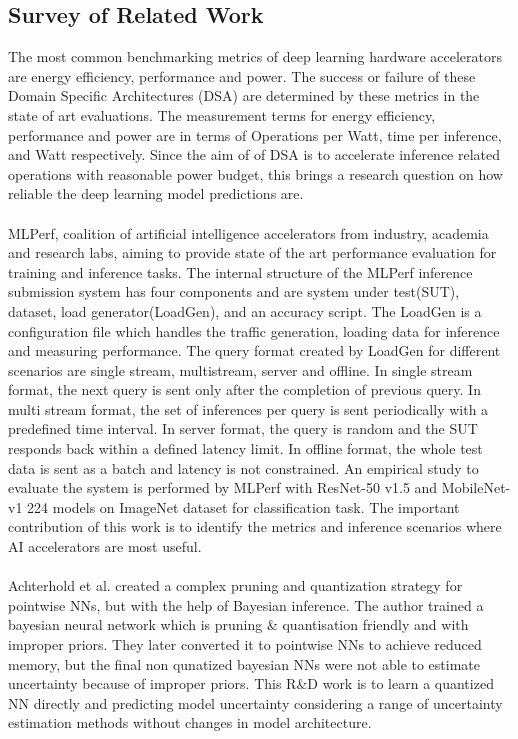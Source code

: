 \documentclass[rnd]{mas_proposal}
\begin{document}
\subsection{Survey of Related Work}
The most common benchmarking metrics of deep learning hardware accelerators are energy efficiency, performance and power. The success or failure of these Domain Specific Architectures (DSA) are determined by these metrics in the state of art evaluations. The measurement terms for energy efficiency, performance and power are in terms of Operations per Watt, time per inference, and Watt respectively. Since the aim of of DSA is to accelerate inference related operations with reasonable power budget, this brings a research question on how reliable the deep learning model predictions are.
\\\\
MLPerf, coalition of artificial intelligence accelerators from industry, academia and research labs, aiming to provide state of the art performance evaluation for training and inference tasks. The internal structure of the MLPerf inference submission system has four components and are system under test(SUT), dataset, load generator(LoadGen), and an accuracy script. The LoadGen is a configuration file which handles the traffic generation, loading data for inference  and measuring performance. The query format created by LoadGen for different scenarios are single stream, multistream, server and offline. In single stream format, the next query is sent only after the completion of previous query. In multi stream format, the set of inferences per query is sent periodically with a  predefined time interval. In server format, the query is random and the SUT responds back within a defined latency limit. In offline format, the whole test data is sent as a batch and latency is not constrained. An empirical study to evaluate the system is performed by MLPerf with ResNet-50 v1.5 and MobileNet-v1 224 models on ImageNet dataset for classification task. The important contribution of this work is to identify the metrics and inference scenarios where AI accelerators are most useful.
\\\\
Achterhold et al. created a complex pruning and quantization strategy for pointwise NNs, but with the help of Bayesian inference\cite{achterhold2018variational}. The author trained a bayesian neural network which is pruning \& quantisation friendly and with improper priors. They later converted it to pointwise NNs to achieve reduced memory, but the final non qunatized bayesian NNs were not able to estimate uncertainty because of improper priors\cite{ferianc2021effects}. This R\&D work is to learn a quantized NN directly and predicting model uncertainty considering a range of uncertainty estimation methods without changes in model architecture.
\end{document}
